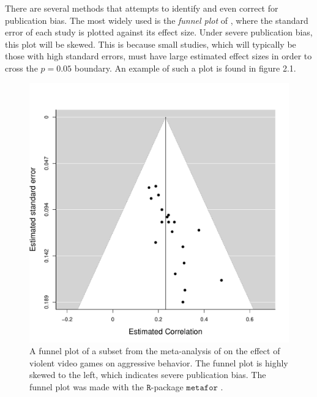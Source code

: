 There are several methods that attempts to identify and even correct
for publication bias. The most widely used is the \emph{funnel plot}
of \cite{Egger1998-kj}, where the standard error of each study
is plotted against its effect size. Under severe publication bias,
this plot will be skewed. This is because small studies, which will
typically be those with high standard errors, must have large estimated
effect sizes in order to cross the $p=0.05$ boundary. An example
of such a plot is found in figure 2.1.

\begin{figure}
\noindent \begin{centering}
\includegraphics[scale=0.5]{chunks/anderson}
\par\end{centering}
\caption{\label{fig:A-funnel-plot}A funnel plot of a subset from the meta-analysis
of \cite{anderson_violent_2010} on the effect of violent video games
on aggressive behavior. The funnel plot is highly skewed to the left,
which indicates severe publication bias. The funnel plot was made
with the $\mathtt{R}$-package \cite{team_r_2000}
$\mathtt{metafor}$ \parencite{viechtbauer_conducting_2010}.}
\end{figure}

